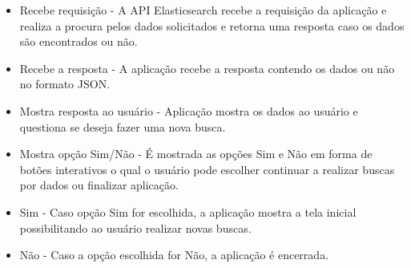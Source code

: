 \begin{itemize}
	\item Recebe requisição - A API Elasticsearch recebe a requisição da aplicação e realiza a procura pelos dados solicitados e retorna uma resposta caso os dados são encontrados ou não.
	\item Recebe a resposta - A aplicação recebe a resposta contendo os dados ou não no formato JSON.
	\item Mostra resposta ao usuário - Aplicação mostra os dados ao usuário e questiona se deseja fazer uma nova busca.
	\item Mostra opção Sim/Não - É mostrada as opções Sim e Não em forma de botões interativos o qual o usuário pode escolher continuar a realizar buscas por dados ou finalizar aplicação.
	\item Sim - Caso opção Sim for escolhida, a aplicação mostra a tela inicial possibilitando ao usuário realizar novas buscas.
	\item Não - Caso a opção escolhida for Não, a aplicação é encerrada.
\end{itemize}

